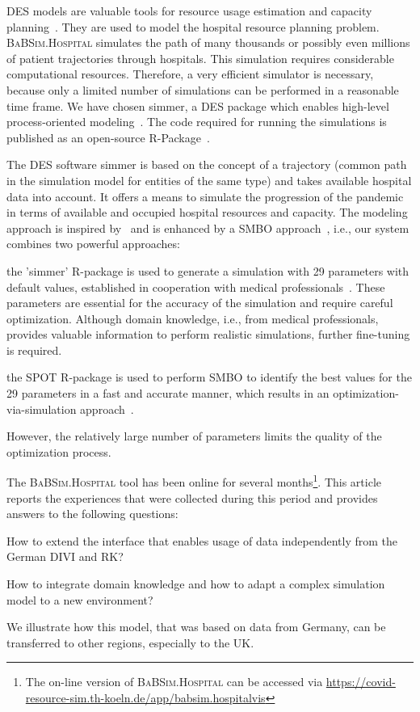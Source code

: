 \documentclass[conference]{IEEEtran}
\newcommand{\babsimhospital}{\textsc{BaBSim.Hospital}\xspace}
\renewenvironment{description}[0]{\begin{compactdesc}}{\end{compactdesc}}
\begin{document}
\gls{DES} models are valuable tools for resource usage estimation and capacity planning~\cite{Bank01a}.
They are used to model the hospital resource planning problem. 
\babsimhospital simulates the path of many thousands or possibly even millions of patient trajectories through hospitals.
This simulation requires considerable computational resources.
Therefore, a very efficient simulator is necessary, because only a limited number of simulations can be performed in a reasonable time frame.
We have chosen \gls{simmer}, a \gls{DES} package which enables high-level process-oriented modeling~\citep{Ucar19a}. 
The code required for running the simulations is published as an open-source R-Package~\citep{bart20rArxiv, bart20t}.

The \gls{DES} software \gls{simmer} is based on the concept of a trajectory (common path in the simulation model for entities of the same type) and takes available hospital data into account. It offers a means to simulate the progression of the pandemic in terms of available and occupied hospital resources and capacity. 
The modeling approach is inspired by~\citet{Lawt19a} and is enhanced by a  \gls{SMBO} approach~\citep{Forr08a}, i.e., our system combines two  powerful approaches: 
\begin{description}
    \item[Discrete event simulation:] the 'simmer' R-package is used to generate a simulation with 29 parameters with default values, established in cooperation with medical professionals~\citep{Ucar19a}. These parameters are essential for the accuracy of the simulation and require careful optimization. Although domain knowledge, i.e., from medical professionals, provides valuable information to perform realistic simulations, further fine-tuning is required.
    \item [Model-based optimization:] the  \gls{SPOT} R-package is used to perform  \gls{SMBO} to identify the best values for the 29 parameters in a fast and accurate manner, which results in an optimization-via-simulation approach~\cite{Fu94a}.
\end{description}
However, the relatively large number of parameters limits the quality of the optimization process. 

The \babsimhospital tool has been online for several months\footnote{The on-line version of \babsimhospital can be accessed via \url{https://covid-resource-sim.th-koeln.de/app/babsim.hospitalvis}}. 
This article reports the experiences that were collected during this period and provides answers to the following questions:
\begin{compactenum}[(Q-1)]
\item How to extend the interface that enables  usage  of  data  independently  from  the German DIVI  and  RK?
\item How to integrate domain knowledge and how to adapt a complex simulation model to a new environment?
\end{compactenum}
We illustrate how this model, that was based on data from Germany, can be transferred to other regions, especially to the UK. 
\end{document}
